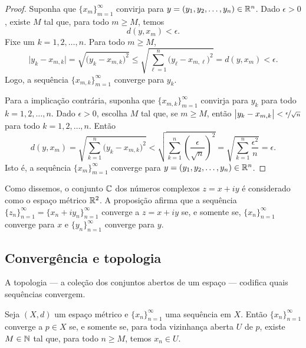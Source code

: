\begin{proof}
Suponha que
$\{ x_m \}_{m=1}^\infty$ convirja para
$y = (y_1,y_2,\ldots,y_n) \in {\mathbb{R}}^n$.
Dado $\epsilon > 0$, existe $M$ tal que, para todo
$m \geq M$, temos
\begin{equation*}
d(y,x_m) < \epsilon.
\end{equation*}
Fixe um $k=1,2,\ldots,n$. Para todo $m \geq M$,
\begin{equation*}
\bigl\lvert y_k - x_{m,k} \bigr\rvert
=
\sqrt{{\bigl(y_k - x_{m,k} \bigr)}^2}
\leq
\sqrt{\sum_{\ell=1}^n {\bigl(y_\ell-x_{m,\ell}\bigr)}^2}
= d(y,x_m) < \epsilon .
\end{equation*}
Logo, a sequência $\{ x_{m,k} \}_{m=1}^\infty$ converge para $y_k$.

Para a implicação contrária, suponha que 
$\{ x_{m,k} \}_{m=1}^\infty$ convirja para $y_k$ para todo $k=1,2,\ldots,n$.
Dado $\epsilon > 0$, escolha $M$ tal que, se $m \geq M$, então 
$\bigl\lvert y_k-x_{m,k} \bigr\rvert < \nicefrac{\epsilon}{\sqrt{n}}$ para todo
$k=1,2,\ldots,n$. Então
\begin{equation*}
d(y,x_m)
=
\sqrt{\sum_{k=1}^n {\bigl(y_k-x_{m,k}\bigr)}^2}
<
\sqrt{\sum_{k=1}^n {\left(\frac{\epsilon}{\sqrt{n}}\right)}^2}
=
\sqrt{\sum_{k=1}^n \frac{{\epsilon^2}}{n}}
= \epsilon .
\end{equation*}
Isto é, a sequência $\{ x_m \}_{m=1}^\infty$ converge para
$y = (y_1,y_2,\ldots,y_n) \in {\mathbb{R}}^n$.
\end{proof}

\begin{example}
Como dissemos, o conjunto ${\mathbb{C}}$ dos números complexos $z = x+iy$ é considerado
como o espaço métrico ${\mathbb{R}}^2$. A proposição afirma que a sequência
$\{ z_n \}_{n=1}^\infty = \{ x_n + iy_n \}_{n=1}^\infty$ converge
a $z = x+iy$
se, e somente se, $\{ x_n \}_{n=1}^\infty$ converge para $x$ e
$\{ y_n \}_{n=1}^\infty$ converge para $y$.
\end{example}

\subsection{Convergência e topologia}

A topologia — a coleção dos conjuntos abertos de um espaço — codifica quais
sequências convergem.

\begin{prop} \label{prop:msconvtopo}
Seja $(X,d)$ um espaço métrico e $\{x_n\}_{n=1}^\infty$ uma sequência em $X$.
Então
$\{ x_n \}_{n=1}^\infty$ converge a $p \in X$ se, e somente se, para toda
vizinhança aberta $U$ de $p$, existe $M \in {\mathbb{N}}$ tal que, para todo $n \geq M$,
temos $x_n \in U$.
\end{prop}

